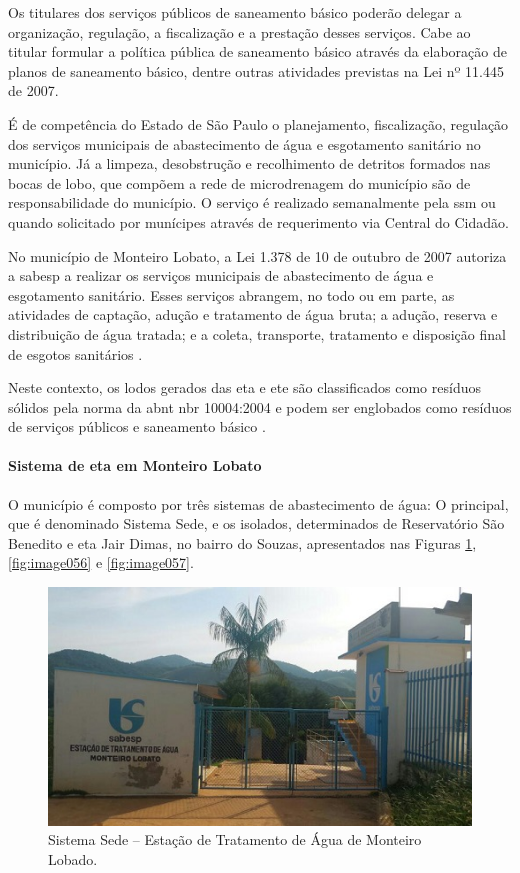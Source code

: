 Os titulares dos serviços públicos de saneamento básico poderão delegar a organização, regulação, a fiscalização e a prestação desses serviços. Cabe ao titular formular a política pública de saneamento básico através da elaboração de planos de saneamento básico, dentre outras atividades previstas na Lei nº 11.445 de 2007.

É de competência do Estado de São Paulo o planejamento, fiscalização, regulação dos serviços municipais de abastecimento de água e esgotamento sanitário no município. Já a limpeza, desobstrução e recolhimento de detritos formados nas bocas de lobo, que compõem a rede de microdrenagem do município são de responsabilidade do município. O serviço é realizado semanalmente pela \gls{ssm} ou quando solicitado por munícipes através de requerimento via Central do Cidadão.

No município de Monteiro Lobato, a Lei 1.378 de 10 de outubro de 2007 autoriza a \gls{sabesp} a realizar os serviços municipais de abastecimento de água e esgotamento sanitário. Esses serviços abrangem, no todo ou em parte, as atividades de captação, adução e tratamento de água bruta; a adução, reserva e distribuição de água tratada; e a coleta, transporte, tratamento e disposição final de esgotos sanitários \cite{MonteiroLobato2007}.

Neste contexto, os lodos gerados das \gls{eta} e \gls{ete} são classificados como resíduos sólidos pela norma da \gls{abnt} \gls{nbr} 10004:2004 e podem ser englobados como resíduos de serviços públicos e saneamento básico \cite{PERS2014}.

\paragraph{\textbf{Sistema de \gls{eta} em Monteiro Lobato}}

O município é composto por três sistemas de abastecimento de água: O principal, que é denominado Sistema Sede, e os isolados, determinados de Reservatório São Benedito e \gls{eta} Jair Dimas, no bairro do Souzas, apresentados nas Figuras \ref{fig:image055}, \ref{fig:image056} e \ref{fig:image057}. 

\begin{figure}
	\centering
	\includegraphics[width=0.75\linewidth]{produtos/prodtres/image055}
	\caption{Sistema Sede – Estação de Tratamento de Água de Monteiro Lobado.}
	\label{fig:image055}
\end{figure}


